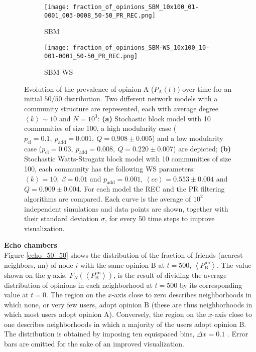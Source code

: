 \documentclass[11 pt , letterpaper , twoside , openright]{book}
\begin{document}
\begin{figure}[H]
  \begin{subfigure}[b]{0.49\textwidth}
    \caption{SBM}
    \texttt{[image: fraction\_of\_opinions\_SBM\_10x100\_01-0001\_003-0008\_50-50\_PR\_REC.png]}
    \label{sbm_50-50}
  \end{subfigure}
  \begin{subfigure}[b]{0.49\textwidth}
    \caption{SBM-WS}
    \texttt{[image: fraction\_of\_opinions\_SBM-WS\_10x100\_10-001-0001\_50-50\_PR\_REC.png]}
    \label{sbm-ws_50-50}
  \end{subfigure}
  \captionsetup{format=plain}
  \caption[Evolution of the prevalence of opinion A ($P_{\text{A}}(t)$) over time for an initial $50/50$ opinion distribution.]{Evolution of the prevalence of opinion A ($P_{\text{A}}(t)$) over time for an initial $50/50$ distribution. Two different network models with a community structure are represented, each with average degree $\left<k\right> \sim 10$ and $N = 10^3$: \textbf{(a)} Stochastic block model with 10 communities of size 100, a high modularity case ($p_{\text{cl}} = 0.1,\ p_{\text{add}} = 0.001,\ Q = 0.908 \pm 0.005$) and a low modularity case ($p_{\text{cl}} = 0.03,\ p_{\text{add}} = 0.008,\ Q = 0.220 \pm 0.007$) are depicted; \textbf{(b)} Stochastic Watts-Strogatz block model with 10 communities of size 100, each community has the following WS parameters: $\left<k\right> = 10,\ \beta = 0.01$ and $p_{\text{add}} = 0.001$, $\left<cc\right> = 0.553 \pm 0.004$ and $Q = 0.909 \pm 0.004$. For each model the REC and the PR filtering algorithms are compared. Each curve is the average of $10^2$ independent simulations and data points are shown, together with their standard deviation $\sigma$, for every 50 time steps to improve visualization.}
\label{ev_op_50_50}
\end{figure}
\noindent
\textbf{Echo chambers}\\
\newline
Figure \ref{echo_50_50} shows the distribution of the fraction of friends (nearest neighbors, nn) of node $i$ with the same opinion B at $t=500$, $\left<P_{\text{B}}^{\text{nn}}\right>$. The value shown on the $y$-axis, $F_N(\left<P_{\text{B}}^{\text{nn}}\right>)$, is the result of dividing the average distribution of opinions in each neighborhood at $t=500$ by its corresponding value at $t=0$. The region on the $x$-axis close to zero describes neighborhoods in which none, or very few users, adopt opinion B (these are thus neighborhoods in which most users adopt opinion A). Conversely, the region on the $x$-axis close to one describes neighborhoods in which a majority of the users adopt opinion B. The distribution is obtained by imposing ten equispaced bins, $\Delta x = 0.1$ \cite{Perra2019}. Error bars are omitted for the sake of an improved visualization.
\end{document}

